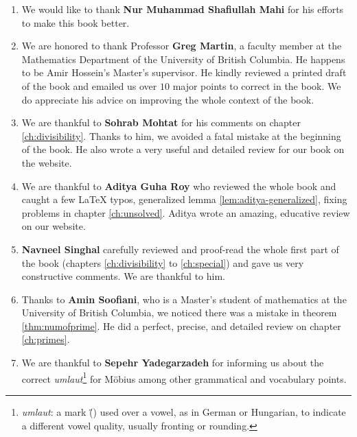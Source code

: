\documentclass[leqno,12pt]{book}
\begin{document}
\begin{enumerate}
		\item We would like to thank \textbf{Nur Muhammad Shafiullah Mahi} for his efforts to make this book better.

		\item We are honored to thank Professor \textbf{Greg Martin}, a faculty member at the Mathematics Department of the University of British Columbia. He happens to be Amir Hossein's Master's supervisor. He kindly reviewed a printed draft of the book and emailed us over $10$ major points to correct in the book. We do appreciate his advice on improving the whole context of the book.

		\item We are thankful to \textbf{Sohrab Mohtat} for his comments on chapter \ref{ch:divisibility}. Thanks to him, we avoided a fatal mistake at the beginning of the book. He also wrote a very useful and detailed review for our book on the website.

		\item We are thankful to \textbf{Aditya Guha Roy} who reviewed the whole book and caught a few LaTeX typos, generalized lemma \eqref{lem:aditya-generalized}, fixing problems in chapter \ref{ch:unsolved}. Aditya wrote an amazing, educative review on our website.
		\item \textbf{Navneel Singhal} carefully reviewed and proof-read the whole first part of the book (chapters \ref{ch:divisibility} to \ref{ch:special}) and gave us very constructive comments. We are thankful to him.

		\item Thanks to \textbf{Amin Soofiani}, who is a Master's student of mathematics at the University of British Columbia, we noticed there was a mistake in theorem \eqref{thm:numofprime}. He did a perfect, precise, and detailed review on chapter \ref{ch:primes}.

		\item We are thankful to \textbf{Sepehr Yadegarzadeh} for informing us about the correct \textit{umlaut}\footnote{\textit{umlaut}: a mark (\"{}) used over a vowel, as in German or Hungarian, to indicate a different vowel quality, usually fronting or rounding.} for M\"{o}bius among other grammatical and vocabulary points.
	\end{enumerate}
\clearpage
\tableofcontents
\end{document}
